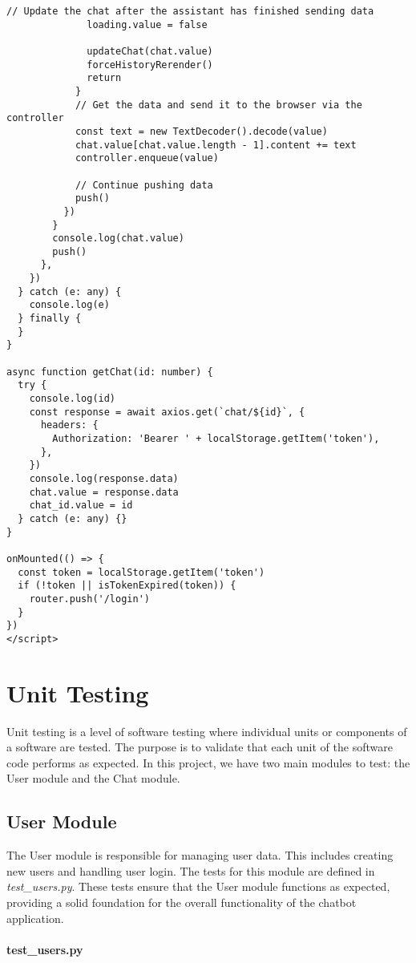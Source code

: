\begin{Verbatim}[breaklines=true, breakanywhere=true]
              // Update the chat after the assistant has finished sending data
              loading.value = false

              updateChat(chat.value)
              forceHistoryRerender()
              return
            }
            // Get the data and send it to the browser via the controller
            const text = new TextDecoder().decode(value)
            chat.value[chat.value.length - 1].content += text
            controller.enqueue(value)

            // Continue pushing data
            push()
          })
        }
        console.log(chat.value)
        push()
      },
    })
  } catch (e: any) {
    console.log(e)
  } finally {
  }
}

async function getChat(id: number) {
  try {
    console.log(id)
    const response = await axios.get(`chat/${id}`, {
      headers: {
        Authorization: 'Bearer ' + localStorage.getItem('token'),
      },
    })
    console.log(response.data)
    chat.value = response.data
    chat_id.value = id
  } catch (e: any) {}
}

onMounted(() => {
  const token = localStorage.getItem('token')
  if (!token || isTokenExpired(token)) {
    router.push('/login')
  }
})
</script>
\end{Verbatim}

\section{Unit Testing}

Unit testing is a level of software testing where individual units or components of a software are tested. The purpose is to validate that each unit of the software code performs as expected. In this project, we have two main modules to test: the User module and the Chat module.

\subsection{User Module}

The User module is responsible for managing user data. This includes creating new users and handling user login. The tests for this module are defined in \textit{test\_users.py}. These tests ensure that the User module functions as expected, providing a solid foundation for the overall functionality of the chatbot application.\\\\
\textbf{test\_users.py}


